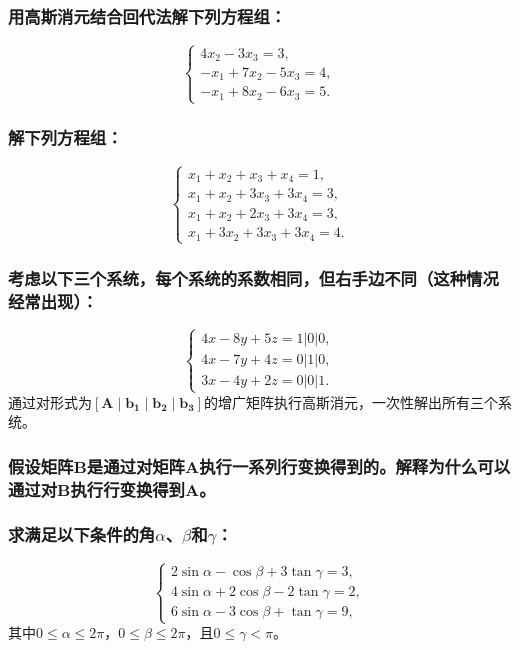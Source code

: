 \subsubsection{用高斯消元结合回代法解下列方程组：}
\[
\begin{cases}
	4x_2 - 3x_3 = 3, \\
	-x_1 + 7x_2 - 5x_3 = 4, \\
	-x_1 + 8x_2 - 6x_3 = 5.
\end{cases}
\]

\subsubsection{解下列方程组：}
\[
\begin{cases}
	x_1 + x_2 + x_3 + x_4 = 1, \\
	x_1 + x_2 + 3x_3 + 3x_4 = 3, \\
	x_1 + x_2 + 2x_3 + 3x_4 = 3, \\
	x_1 + 3x_2 + 3x_3 + 3x_4 = 4.
\end{cases}
\]

\subsubsection{考虑以下三个系统，每个系统的系数相同，但右手边不同（这种情况经常出现）：}
\[
\begin{cases}
	4x - 8y + 5z = 1 \big| 0 \big| 0, \\
	4x - 7y + 4z = 0 \big| 1 \big| 0, \\
	3x - 4y + 2z = 0 \big| 0 \big| 1.
\end{cases}
\]
通过对形式为\( [\mathbf{A} \mid \mathbf{b_1} \mid \mathbf{b_2} \mid \mathbf{b_3}] \)的增广矩阵执行高斯消元，一次性解出所有三个系统。

\subsubsection{假设矩阵\(\mathbf{B}\)是通过对矩阵\(\mathbf{A}\)执行一系列行变换得到的。解释为什么可以通过对\(\mathbf{B}\)执行行变换得到\(\mathbf{A}\)。}

\subsubsection{求满足以下条件的角\(\alpha\)、\(\beta\)和\(\gamma\)：}
\[
\begin{cases}
	2\sin\alpha - \cos\beta + 3\tan\gamma = 3, \\
	4\sin\alpha + 2\cos\beta - 2\tan\gamma = 2, \\
	6\sin\alpha - 3\cos\beta + \tan\gamma = 9,
\end{cases}
\]
其中\(0 \leq \alpha \leq 2\pi\)，\(0 \leq \beta \leq 2\pi\)，且\(0 \leq \gamma < \pi\)。

